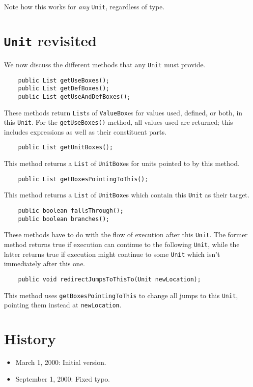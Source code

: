 \documentclass{article}
\begin{document}
Note how this works for {\em any} {\tt Unit}, regardless of type.

\section{{\tt Unit} revisited}

We now discuss the different methods that any {\tt Unit} must provide.

\begin{verbatim}
    public List getUseBoxes();
    public List getDefBoxes();
    public List getUseAndDefBoxes();
\end{verbatim}

These methods return {\tt List}s of {\tt ValueBox}es for values used,
defined, or both, in this {\tt Unit}.  For the {\tt getUseBoxes()} method,
all values used are returned; this includes expressions as well as their
constituent parts.

\begin{verbatim}
    public List getUnitBoxes();
\end{verbatim}

This method returns a {\tt List} of {\tt UnitBox}es for units
pointed to by this method.

\begin{verbatim}
    public List getBoxesPointingToThis();
\end{verbatim}

This method returns a {\tt List} of {\tt UnitBox}es which contain
this {\tt Unit} as their target.

\begin{verbatim}
    public boolean fallsThrough();
    public boolean branches();        
\end{verbatim}

These methods have to do with the flow of execution after this
{\tt Unit}. The former method returns true if execution can continue
to the following {\tt Unit}, while the latter returns true if
execution might continue to some {\tt Unit} which isn't immediately
after this one.
    
\begin{verbatim}
    public void redirectJumpsToThisTo(Unit newLocation);
\end{verbatim}

This method uses {\tt getBoxesPointingToThis} to change all
jumps to this {\tt Unit}, pointing them instead at {\tt newLocation}.

\section{History}
\begin{itemize}
\item March 1, 2000: Initial version.
\item September 1, 2000: Fixed typo.
\end{itemize}
\end{document}
